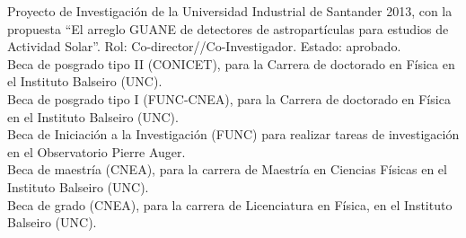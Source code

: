  Proyecto de Investigación de la Universidad Industrial de Santander 2013, con la propuesta ``El arreglo GUANE de detectores de astropartículas para estudios de Actividad Solar''. Rol: Co-director//Co-Investigador. Estado: aprobado.\\
 Beca de posgrado tipo II (CONICET), para la Carrera de doctorado en Física en el Instituto Balseiro (UNC).\\
 Beca de posgrado tipo I (FUNC-CNEA), para la Carrera de doctorado en Física en el Instituto Balseiro (UNC).\\
 Beca de Iniciación a la Investigación (FUNC) para realizar tareas de investigación en el Observatorio Pierre Auger.\\
 Beca de maestría (CNEA), para la carrera de Maestría en Ciencias Físicas en el Instituto Balseiro (UNC).\\
 Beca de grado (CNEA), para la carrera de Licenciatura en Física, en el Instituto Balseiro (UNC).\\
\fi
\fi